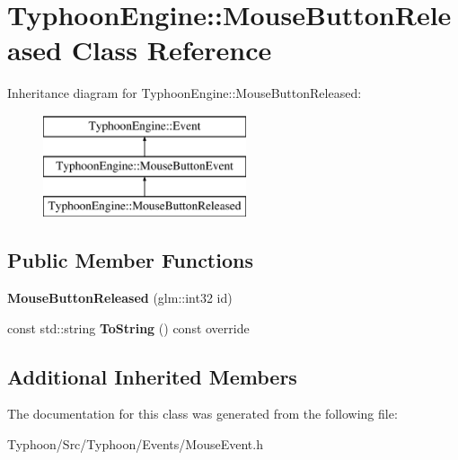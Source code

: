 \hypertarget{class_typhoon_engine_1_1_mouse_button_released}{}\section{Typhoon\+Engine\+::Mouse\+Button\+Released Class Reference}
\label{class_typhoon_engine_1_1_mouse_button_released}
Inheritance diagram for Typhoon\+Engine\+::Mouse\+Button\+Released\+:\begin{figure}[H]
\begin{center}
\leavevmode
\includegraphics[height=3.000000cm]{class_typhoon_engine_1_1_mouse_button_released}
\end{center}
\end{figure}
\subsection*{Public Member Functions}
\begin{DoxyCompactItemize}
\item 
\mbox{\label{class_typhoon_engine_1_1_mouse_button_released_a53d309156c0ae06cc18a9ae463ba7e76}} 
{\bfseries Mouse\+Button\+Released} (glm\+::int32 id)
\item 
\mbox{\label{class_typhoon_engine_1_1_mouse_button_released_ad972735659b335fbbf6e16cdc1666708}} 
const std\+::string {\bfseries To\+String} () const override
\end{DoxyCompactItemize}
\subsection*{Additional Inherited Members}


The documentation for this class was generated from the following file\+:\begin{DoxyCompactItemize}
\item 
Typhoon/\+Src/\+Typhoon/\+Events/Mouse\+Event.\+h\end{DoxyCompactItemize}
